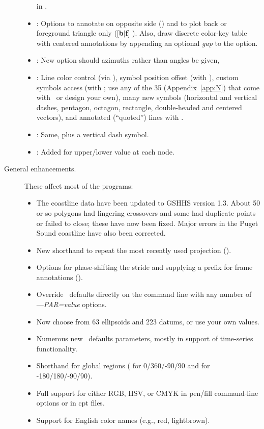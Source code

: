 \begin{description}
\begin{itemize}
in .
\item {}:	Options to annotate on opposite side () and to plot back or foreground
triangle only ([\textbf{b$|$f}] ).  Also, draw discrete color-key table with centered annotations by appending an optional
\emph{gap} to the  option. 
\item {}: 	New option  should azimuths rather than angles be given,
\item {}: 	Line color control (via ), symbol position offset (with ), custom symbols access 
(with ; use any of the 35 (Appendix~\ref{app:N}) that come with \GMT\ or design your own), many new symbols (horizontal and vertical dashes,
pentagon, octagon, rectangle, double-headed and centered vectors), and annotated (``quoted'') lines with .
\item {}: 	Same, plus a vertical dash symbol.
\item {}: 	Added  for upper/lower value at each node.
\end{itemize}
\item [General enhancements.]  These affect most of the programs:
\begin{itemize}
\item The coastline data have been updated to GSHHS version 1.3.  About 50 or so polygons had lingering
crossovers and some had duplicate points or failed to close; these have now been fixed. Major
errors in the Puget Sound coastline have also been corrected.
\item New shorthand to repeat the most recently used projection ().
\item Options for phase-shifting the stride and supplying a prefix for frame annotations ().
\item Override \GMT\ defaults directly on the command line with any number of {--}{--}\emph{PAR=value} options.
\item Now choose from 63 ellipsoids and 223 datums, or use your own values.
\item Numerous new \GMT\ defaults parameters, mostly in support of time-series functionality.
\item Shorthand for global regions ( for 0/360/-90/90 and  for -180/180/-90/90).
\item Full support for either RGB, HSV, or CMYK in pen/fill command-line options or in cpt files.
\item Support for English color names (e.g., red, lightbrown).

\end{itemize}
\end{description}
